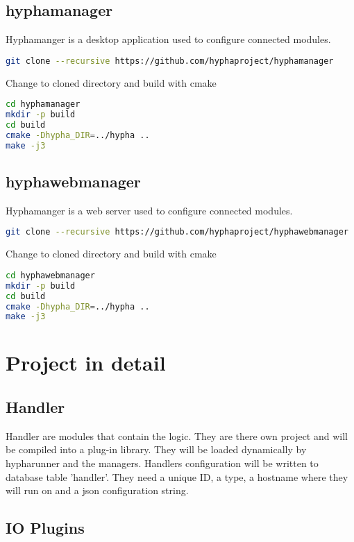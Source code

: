 \documentclass[english,a4paper,11pt]{report}
\begin{document}
\section{hyphamanager}
Hyphamanger is a desktop application used to configure connected modules.
\begin{lstlisting}[language=bash,caption={git clone hyphamanager}]
git clone --recursive https://github.com/hyphaproject/hyphamanager
\end{lstlisting}
Change to cloned directory and build with cmake
\begin{lstlisting}[language=bash,caption={build hyphamanager}]
cd hyphamanager
mkdir -p build
cd build
cmake -Dhypha_DIR=../hypha ..
make -j3
\end{lstlisting}

\section{hyphawebmanager}
Hyphamanger is a web server used to configure connected modules.
\begin{lstlisting}[language=bash,caption={git clone hyphawebmanager}]
git clone --recursive https://github.com/hyphaproject/hyphawebmanager
\end{lstlisting}
Change to cloned directory and build with cmake
\begin{lstlisting}[language=bash,caption={git clone hyphawebmanager}]
cd hyphawebmanager
mkdir -p build
cd build
cmake -Dhypha_DIR=../hypha ..
make -j3
\end{lstlisting}


\chapter{Project in detail}

\section{Handler}
Handler are modules that contain the logic.
They are there own project and will be compiled into a plug-in library.
They will be loaded dynamically by hypharunner and the managers.
Handlers configuration will be written to database table 'handler'.
They need a unique ID, a type, a hostname where they will run on and a json configuration string.


\section{IO Plugins}
\end{document}

